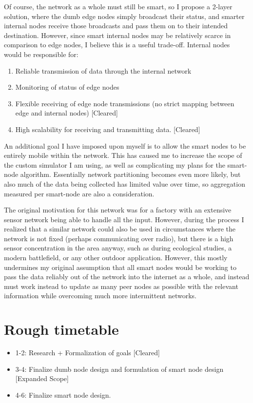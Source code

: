 \documentclass{article}
\begin{document}
Of course, the network as a whole must still be smart, so I propose a 2-layer solution, where the dumb edge nodes simply broadcast their status, and smarter internal nodes receive those broadcasts and pass them on to their intended destination. However, since smart internal nodes may be relatively scarce in comparison to edge nodes, I believe this is a useful trade-off. Internal nodes would be responsible for:
\begin{enumerate}
	\item Reliable transmission of data through the internal network
	\item Monitoring of status of edge nodes
	\item Flexible receiving of edge node transmissions (no strict mapping between edge and internal nodes) [Cleared]
	\item High scalability for receiving and transmitting data. [Cleared]
\end{enumerate}

An additional goal I have imposed upon myself is to allow the smart nodes to be entirely mobile within the network. This has caused me to increase the scope of the custom simulator I am using, as well as complicating my plans for the smart-node algorithm. Essentially network partitioning becomes even more likely, but also much of the data being collected has limited value over time, so aggregation measured per smart-node are also a consideration. 

The original motivation for this network was for a factory with an extensive sensor network being able to handle all the input. However, during the process I realized that a similar network could also be used in circumstances where the network is not fixed (perhaps communicating over radio), but there is a high sensor concentration in the area anyway, such as during ecological studies, a modern battlefield, or any other outdoor application. However, this mostly undermines my original assumption that all smart nodes would be working to pass the data reliably out of the network into the internet as a whole, and instead must work instead to update as many peer nodes as possible with the relevant information while overcoming much more intermittent networks.

\section{Rough timetable}

\begin{itemize}
	\item 1-2: Research + Formalization of goals [Cleared]
	\item 3-4: Finalize dumb node design and formulation of smart node design [Expanded Scope]
	\item 4-6: Finalize smart node design.
\end{itemize}
\end{document}
